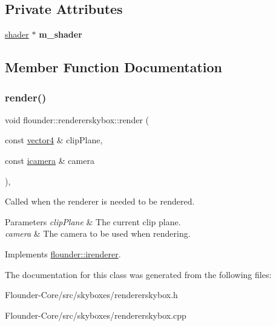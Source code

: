 \subsection*{Private Attributes}
\begin{DoxyCompactItemize}
\item 
\mbox{\label{classflounder_1_1rendererskybox_adb28a7431338a5af369601d7c8ef73ff}} 
\hyperlink{classflounder_1_1shader}{shader} $\ast$ {\bfseries m\+\_\+shader}
\end{DoxyCompactItemize}


\subsection{Member Function Documentation}
\mbox{\label{classflounder_1_1rendererskybox_a66714b2e580cd64a30e92d78a0260a33}} 
\subsubsection{\texorpdfstring{render()}{render()}}
{\footnotesize\ttfamily void flounder\+::rendererskybox\+::render (\begin{DoxyParamCaption}\item[{const \hyperlink{classflounder_1_1vector4}{vector4} \&}]{clip\+Plane,  }\item[{const \hyperlink{classflounder_1_1icamera}{icamera} \&}]{camera }\end{DoxyParamCaption})\hspace{0.3cm}{\ttfamily [override]}, {\ttfamily [virtual]}}



Called when the renderer is needed to be rendered. 


\begin{DoxyParams}{Parameters}
{\em clip\+Plane} & The current clip plane. \\
\hline
{\em camera} & The camera to be used when rendering. \\
\hline
\end{DoxyParams}


Implements \hyperlink{classflounder_1_1irenderer_a3f355dc39e2680bf3f3441d3dfaaa010}{flounder\+::irenderer}.



The documentation for this class was generated from the following files\+:\begin{DoxyCompactItemize}
\item 
Flounder-\/\+Core/src/skyboxes/rendererskybox.\+h\item 
Flounder-\/\+Core/src/skyboxes/rendererskybox.\+cpp\end{DoxyCompactItemize}
